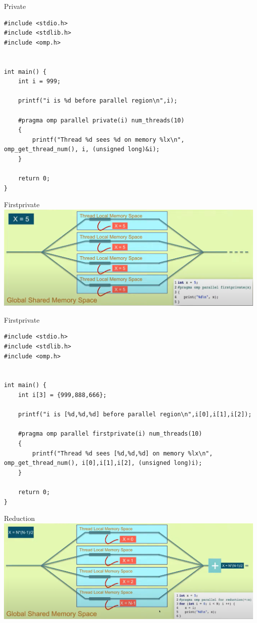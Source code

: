 \documentclass{beamer}
\begin{document}
\begin{frame}[fragile]{Private}
\lstset{language=C++}
\begin{lstlisting}
#include <stdio.h>
#include <stdlib.h>
#include <omp.h>


int main() {
    int i = 999;

    printf("i is %d before parallel region\n",i);

    #pragma omp parallel private(i) num_threads(10)
    {
        printf("Thread %d sees %d on memory %lx\n", omp_get_thread_num(), i, (unsigned long)&i);
    }

    return 0;
}
  \end{lstlisting}
\end{frame}

\begin{frame}{Firstprivate}
  \includegraphics[width=\textwidth]{firstprivate}
\end{frame}

\begin{frame}[fragile]{Firstprivate}
\lstset{language=C++}
\begin{lstlisting}
#include <stdio.h>
#include <stdlib.h>
#include <omp.h>


int main() {
    int i[3] = {999,888,666};

    printf("i is [%d,%d,%d] before parallel region\n",i[0],i[1],i[2]);

    #pragma omp parallel firstprivate(i) num_threads(10)
    {
        printf("Thread %d sees [%d,%d,%d] on memory %lx\n", omp_get_thread_num(), i[0],i[1],i[2], (unsigned long)i);
    }

    return 0;
}
  \end{lstlisting}
\end{frame}


\begin{frame}[fragile]{Reduction}
  \includegraphics[width=\textwidth]{reduction}
\end{frame}
\end{document}
